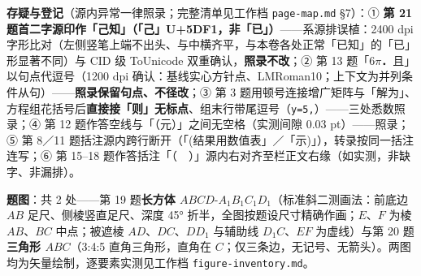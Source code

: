 \begin{gktip}
\textbf{存疑与登记}（源内异常一律照录；完整清单见工作档 \texttt{page-map.md} §7）：① \textbf{第 21 题首二字源印作「己知」（「己」U+5DF1，非「已」）}——系源排误植：2400 dpi 字形比对（左侧竖笔上端不出头、与中横齐平，与本卷各处正常「已知」的「已」形显著不同）与 CID 级 ToUnicode 双重确认，\textbf{照录不改}；② 第 13 题「\(6\pi\)\textbf{．}且」以句点代逗号（1200 dpi 确认：基线实心方针点、LMRoman10；上下文为并列条件从句）——\textbf{照录保留句点、不径改}；③ 第 3 题用顿号连接增广矩阵与「解为」、方程组花括号后\textbf{直接接「则」无标点}、组末行带尾逗号（\texttt{y=5,}）——三处悉数照录；④ 第 12 题作答空线与「（元）」之间无空格（实测间隙 0.03 pt）——照录；⑤ 第 8／11 题括注源内跨行断开（「(结果用数值表」／「示)」），转录按同一括注连写；⑥ 第 15–18 题作答括注「（　）」源内右对齐至栏正文右缘（如实测，非缺字、非漏排）。

\textbf{题图}：共 2 处——第 19 题\textbf{长方体 \(ABCD\text{-}A_{1}B_{1}C_{1}D_{1}\)}（标准斜二测画法：前底边 \(AB\) 足尺、侧棱竖直足尺、深度 45° 折半，全图按题设尺寸精确作画；\(E\)、\(F\) 为棱 \(AB\)、\(BC\) 中点；被遮棱 \(AD\)、\(DC\)、\(DD_{1}\) 与辅助线 \(D_{1}C\)、\(EF\) 为虚线）与第 20 题\textbf{三角形 \(ABC\)}（3:4:5 直角三角形，直角在 \(C\)；仅三条边，无记号、无箭头）。两图均为矢量绘制，逐要素实测见工作档 \texttt{figure-inventory.md}。
\end{gktip}



